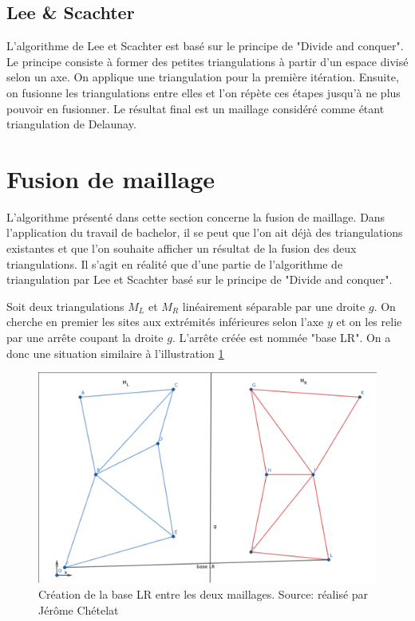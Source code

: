 \subsection{Lee \& Scachter}

L'algorithme de Lee et Scachter est basé sur le principe de "Divide and conquer". Le principe consiste à former des petites triangulations à partir d'un espace divisé selon un axe. On applique une triangulation pour la première itération. Ensuite, on fusionne les triangulations entre elles et l'on répète ces étapes jusqu'à ne plus pouvoir en fusionner. Le résultat final est un maillage considéré comme étant triangulation de Delaunay. 

\section{Fusion de maillage}

L'algorithme présenté dans cette section concerne la fusion de maillage. Dans l'application du travail de bachelor, il se peut que l'on ait déjà des triangulations existantes et que l'on souhaite afficher un résultat de la fusion des deux triangulations. Il s'agit en réalité que d'une partie de l'algorithme de triangulation par Lee et Scachter basé sur le principe de "Divide and conquer".


Soit deux triangulations $M_L$ et $M_R$ linéairement séparable par une droite $g$.
On cherche en premier les sites aux extrémités inférieures selon l'axe $y$ et on les relie par une arrête coupant la droite $g$.
L'arrête créée est nommée "base LR". On a donc une situation similaire à l'illustration \ref{fig:base_lr}

\begin{figure}[!htb]
    \centering
    \includegraphics[width=0.8\linewidth]{figures/base_lr.png}
    \caption{Création de la base LR entre les deux maillages. Source: réalisé par Jérôme Chételat}
    \label{fig:base_lr}
\end{figure}


